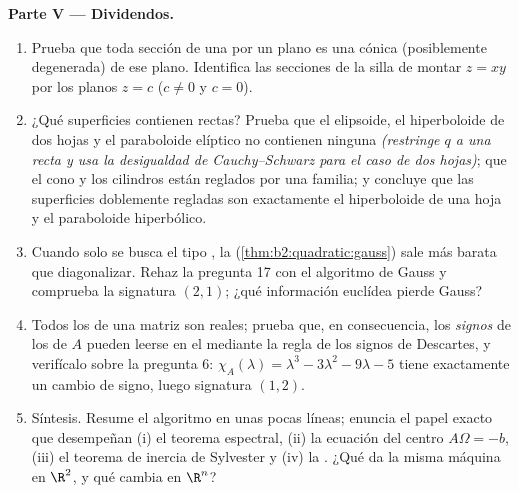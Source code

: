 \begin{problem}
\medskip
\noindent\textbf{Parte V --- Dividendos.}
\begin{enumerate}[resume]
  \item Prueba que toda sección de una  por un plano  es
        una cónica (posiblemente degenerada) de ese plano. Identifica
        las secciones de la silla de montar $z = xy$ por los planos
        $z = c$ ($c \neq 0$ y $c = 0$).
  \item ¿Qué superficies  contienen rectas? Prueba que el
        elipsoide, el hiperboloide de dos hojas y el paraboloide
        elíptico no contienen ninguna \emph{(restringe $q$ a una
        recta y usa la desigualdad de Cauchy--Schwarz para el caso de
        dos hojas)}; que el cono y los cilindros están reglados por
        una familia; y concluye que las superficies 
        doblemente regladas son exactamente el hiperboloide de una
        hoja y el paraboloide hiperbólico.
  \item Cuando solo se busca el tipo \emph{}, la  (\cref{thm:b2:quadratic:gauss}) sale más barata que
        diagonalizar. Rehaz la pregunta 17 con el algoritmo de Gauss
        y comprueba la signatura $(2, 1)$; ¿qué información euclídea
        pierde Gauss?
  \item Todos los  de una matriz  son reales;
        prueba que, en consecuencia, los \emph{signos} de los
         de $A$ pueden leerse en el
         mediante la regla de los signos de
        Descartes, y verifícalo sobre la pregunta 6:
        $\chi_A(\lambda) = \lambda^3 - 3\lambda^2 - 9\lambda - 5$
        tiene exactamente un cambio de signo, luego signatura $(1,
        2)$.
  \item Síntesis. Resume el algoritmo en unas pocas líneas; enuncia
        el papel exacto que desempeñan (i) el teorema espectral, (ii)
        la ecuación del centro $A\Omega = -b$, (iii) el teorema de
        inercia de Sylvester y (iv) la . ¿Qué da la
        misma máquina en $\R^2$, y qué cambia en $\R^n$?
\end{enumerate}
\end{problem}
